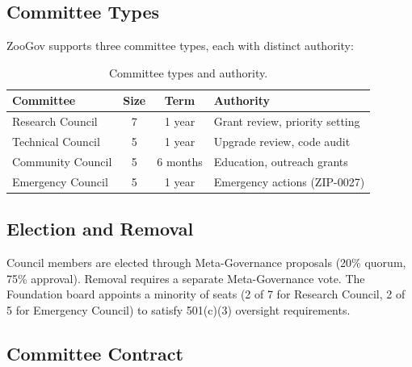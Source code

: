 \documentclass[11pt,letterpaper]{article}
\begin{document}
\subsection{Committee Types}

ZooGov supports three committee types, each with distinct authority:

\begin{table}[h]
\centering
\caption{Committee types and authority.}
\label{tab:committees}
\begin{tabular}{lccl}
\toprule
\textbf{Committee} & \textbf{Size} & \textbf{Term} & \textbf{Authority} \\
\midrule
Research Council & 7 & 1 year & Grant review, priority setting \\
Technical Council & 5 & 1 year & Upgrade review, code audit \\
Community Council & 5 & 6 months & Education, outreach grants \\
Emergency Council & 5 & 1 year & Emergency actions (ZIP-0027) \\
\bottomrule
\end{tabular}
\end{table}

\subsection{Election and Removal}

Council members are elected through Meta-Governance proposals (20\% quorum, 75\% approval). Removal requires a separate Meta-Governance vote. The Foundation board appoints a minority of seats (2 of 7 for Research Council, 2 of 5 for Emergency Council) to satisfy 501(c)(3) oversight requirements.

\subsection{Committee Contract}
\end{document}
